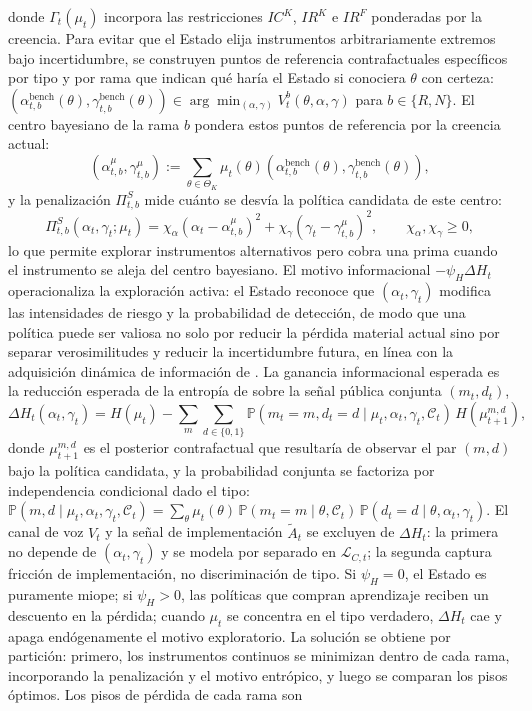 \documentclass[review,authoryear,12pt]{elsarticle}
\theoremstyle{plain}
\theoremstyle{definition}
\newcommand{\Prob}{\mathbb{P}}
\newcommand{\ThetaK}{\Theta_K}
\newcommand{\1}{\mathbf{1}}
\begin{document}
donde $\Gamma_t(\mu_t)$ incorpora las restricciones $IC^K$, $IR^K$ e $IR^F$ ponderadas por la creencia. Para evitar que el Estado elija instrumentos arbitrariamente extremos bajo incertidumbre, se construyen puntos de referencia contrafactuales específicos por tipo y por rama que indican qué haría el Estado si conociera $\theta$ con certeza: $(\alpha_{t,b}^{\mathrm{bench}}(\theta),\gamma_{t,b}^{\mathrm{bench}}(\theta)) \allowbreak \in \allowbreak \arg\min_{(\alpha,\gamma)}V_t^b(\theta,\alpha,\gamma)$ para $b\in\{R,N\}$. El centro bayesiano de la rama $b$ pondera estos puntos de referencia por la creencia actual:
\[
(\alpha_{t,b}^{\mu},\gamma_{t,b}^{\mu}):=\sum_{\theta\in\ThetaK}\mu_t(\theta)(\alpha_{t,b}^{\mathrm{bench}}(\theta),\gamma_{t,b}^{\mathrm{bench}}(\theta)),
\]
y la penalización $\Pi_{t,b}^S$ mide cuánto se desvía la política candidata de este centro:
\begin{equation}
\Pi_{t,b}^S(\alpha_t,\gamma_t;\mu_t)=\chi_\alpha(\alpha_t-\alpha_{t,b}^{\mu})^2+\chi_\gamma(\gamma_t-\gamma_{t,b}^{\mu})^2,\qquad\chi_\alpha,\chi_\gamma\ge 0,
\label{eq:prima-desviacion}
\end{equation}
lo que permite explorar instrumentos alternativos pero cobra una prima cuando el instrumento se aleja del centro bayesiano. El motivo informacional $-\psi_H\Delta H_t$ operacionaliza la exploración activa: el Estado reconoce que $(\alpha_t,\gamma_t)$ modifica las intensidades de riesgo y la probabilidad de detección, de modo que una política puede ser valiosa no solo por reducir la pérdida material actual sino por separar verosimilitudes y reducir la incertidumbre futura, en línea con la adquisición dinámica de información de \citet{Zhong2022}. La ganancia informacional esperada es la reducción esperada de la entropía de \citet{Shannon1948} sobre la señal pública conjunta $(m_t,d_t)$,
\begin{equation}
\Delta H_t(\alpha_t,\gamma_t)=H(\mu_t)-\sum_{m}\sum_{d\in\{0,1\}}\Prob(m_t=m,d_t=d\mid\mu_t,\alpha_t,\gamma_t,\mathcal{C}_t)\,H(\mu_{t+1}^{m,d}),
\label{eq:delta-H}
\end{equation}
donde $\mu_{t+1}^{m,d}$ es el posterior contrafactual que resultaría de observar el par $(m,d)$ bajo la política candidata, y la probabilidad conjunta se factoriza por independencia condicional dado el tipo: $\Prob(m,d\mid\mu_t,\alpha_t,\gamma_t,\mathcal{C}_t)=\sum_{\theta}\mu_t(\theta)\,\Prob(m_t=m\mid\theta,\mathcal{C}_t)\,\Prob(d_t=d\mid\theta,\alpha_t,\gamma_t)$. El canal de voz $V_t$ y la señal de implementación $\tilde{A}_t$ se excluyen de $\Delta H_t$: la primera no depende de $(\alpha_t,\gamma_t)$ y se modela por separado en $\mathcal{L}_{C,t}$; la segunda captura fricción de implementación, no discriminación de tipo. Si $\psi_H=0$, el Estado es puramente miope; si $\psi_H>0$, las políticas que compran aprendizaje reciben un descuento en la pérdida; cuando $\mu_t$ se concentra en el tipo verdadero, $\Delta H_t$ cae y apaga endógenamente el motivo exploratorio. La solución se obtiene por partición: primero, los instrumentos continuos se minimizan dentro de cada rama, incorporando la penalización y el motivo entrópico, y luego se comparan los pisos óptimos. Los pisos de pérdida de cada rama son
\end{document}
